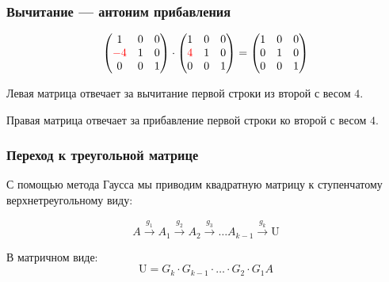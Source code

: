 \begin{frame}
    \frametitle{Вычитание — антоним прибавления}

    

    \[
    \begin{pmatrix}
        1 & 0 & 0 \\
        \textcolor{red}{-4} & 1 & 0 \\
        0 & 0 & 1 \\
    \end{pmatrix}   \cdot 
\begin{pmatrix}
    1 & 0 & 0 \\
    \textcolor{red}{4} & 1 & 0 \\
    0 & 0 & 1 \\
\end{pmatrix} =
\begin{pmatrix}
    1 & 0 & 0 \\
    0 & 1 & 0 \\
    0 & 0 & 1 \\
\end{pmatrix}   
    \]
    
\pause
Левая матрица отвечает за вычитание первой строки из второй с весом $4$.

\pause
Правая матрица отвечает за прибавление первой строки ко второй с весом $4$.


\end{frame}





\begin{frame}
    \frametitle{Переход к треугольной матрице}

    С помощью метода Гаусса мы приводим квадратную матрицу к ступенчатому верхнетреугольному виду:

    \[
    A \overset{g_1}{\to} A_1  \overset{g_2}{\to} A_2 \overset{g_3}{\to} \ldots A_{k-1}\overset{g_k}{\to} \mathrm{U} 
    \]
    \pause

    В матричном виде:
    \[
    \mathrm{U} = G_k \cdot G_{k-1} \cdot \ldots  \cdot  G_2 \cdot G_{1} A
    \]    

\end{frame}



